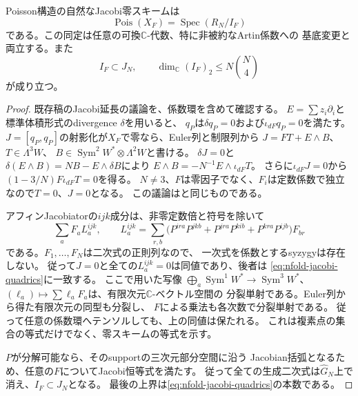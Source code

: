 \begin{lemma}\label{lem:nfold-jacobi-scheme}
Poisson構造の自然なJacobi零スキームは
\begin{equation}\label{eq:nfold-poisson-scheme}
 \operatorname{Pois}(X_F)=\operatorname{Spec}(R_N/I_F)
\end{equation}
である。この同定は任意の可換$\mathbb C$-代数、特に非被約なArtin係数への
基底変更と両立する。また
\begin{equation}\label{eq:nfold-quadratic-inclusion}
 I_F\subset J_N,\qquad
 \dim_{\mathbb C}(I_F)_2\le N\binom N4
\end{equation}
が成り立つ。
\end{lemma}
\begin{proof}
既存稿のJacobi延長の議論を、係数環を含めて確認する。
$E=\sum z_i\partial_i$と標準体積形式のdivergence $\delta$を用いると、
$q_P$は$\delta q_P=0$および$\iota_{dF}q_P=0$を満たす。
$J=[q_P,q_P]$の射影化が$X_F$で零なら、Euler列と制限列から
$J=FT+E\wedge B$、$T\in\Lambda^3W$、
$B\in\operatorname{Sym}^2W^*\otimes\Lambda^2W$と書ける。
$\delta J=0$と
$\delta(E\wedge B)=NB-E\wedge\delta B$により
$E\wedge B=-N^{-1}E\wedge\iota_{dF}T$。
さらに$\iota_{dF}J=0$から
$(1-3/N)F\iota_{dF}T=0$を得る。
$N\ne3$、$F$は零因子でなく、$F_i$は定数係数で独立なので$T=0$、$J=0$となる。
この議論は\cite[命題\texttt{prop:pg-jacobi-extension}]{NCCubicA}と同じものである。

アフィンJacobiatorの$ijk$成分は、非零定数倍と符号を除いて
\begin{equation}\label{eq:nfold-J-linearized}
 \sum_a F_a L_a^{ijk},\qquad
 L_a^{ijk}=
 \sum_{r,b}\bigl(P^{ira}P^{jkb}+P^{jra}P^{kib}+P^{kra}P^{ijb}\bigr)F_{br}
\end{equation}
である。$F_1,\ldots,F_N$は二次式の正則列なので、
一次式を係数とするsyzygyは存在しない。
従って$J=0$と全ての$L_a^{ijk}=0$は同値であり、後者は
\eqref{eq:nfold-jacobi-quadrics}に一致する。
ここで用いた写像
$\bigoplus_a\operatorname{Sym}^1W^*\to\operatorname{Sym}^3W^*$、
$(\ell_a)\mapsto\sum\ell_aF_a$は、有限次元$\mathbb C$-ベクトル空間の
分裂単射である。Euler列から得た有限次元の同型も分裂し、
$F$による乗法も各次数で分裂単射である。
従って任意の係数環へテンソルしても、上の同値は保たれる。
これは複素点の集合の等式だけでなく、零スキームの等式を示す。

$P$が分解可能なら、そのsupportの三次元部分空間に沿う
Jacobian括弧となるため、任意の$F$についてJacobi恒等式を満たす。
従って全ての生成二次式は$\widehat G_N$上で消え、$I_F\subset J_N$となる。
最後の上界は\eqref{eq:nfold-jacobi-quadrics}の本数である。
\end{proof}

